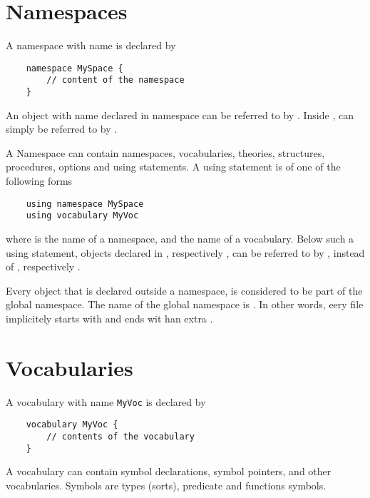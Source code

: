 \documentclass[a4]{article}
\begin{document}
\section{Namespaces}

A namespace with name  is declared by
\begin{lstlisting}
	namespace MySpace {
		// content of the namespace
	}
\end{lstlisting}

An object with name  declared in namespace  can be referred to by .  Inside ,  can simply be referred to by .

A Namespace can contain namespaces, vocabularies, theories, structures, procedures, options and using statements.  A using statement is of one of the following forms
\begin{lstlisting}
	using namespace MySpace
	using vocabulary MyVoc
\end{lstlisting}
where  is the name of a namespace, and  the name of a vocabulary.  Below such a using statement, objects  declared in , respectively , can be referred to by , instead of , respectively .

Every object that is declared outside a namespace, is considered to be part of the global namespace.  The name of the global namespace is .  In other words, eery \idp file implicitely starts with  and ends wit han extra \code{\}}.


\section{Vocabularies}

A vocabulary with name {\tt MyVoc} is declared by
\begin{lstlisting}
	vocabulary MyVoc {
		// contents of the vocabulary
	}
\end{lstlisting}
A vocabulary can contain symbol declarations, symbol pointers, and other vocabularies. Symbols are types (sorts), predicate and functions symbols.


\end{document}
